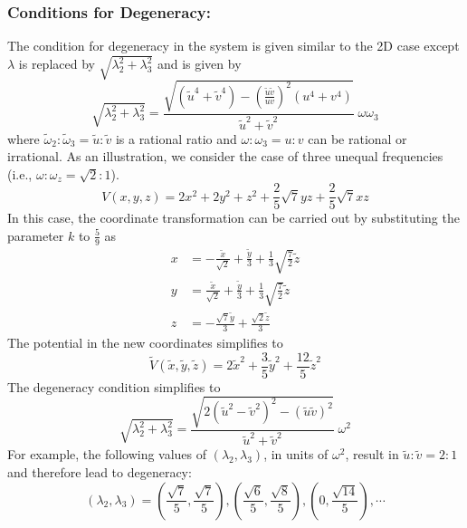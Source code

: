 \documentclass[a4paper, 12pt]{article}
\newcommand{\td}[1]{\tilde{#1}}
\begin{document}
\subsubsection*{Conditions for Degeneracy:}
The condition for degeneracy in the system is given similar to the 2D case except $\lambda$ is replaced by $\sqrt{\lambda_2^2+\lambda_3^2}$ and is given by
\begin{equation}
  \sqrt{\lambda_2^2 + \lambda_3^2} =\frac{\sqrt{(\td{u}^4+\td{v}^4)-\left(\frac{\td{u}\td{v}}{uv}\right)^2(u^4+v^4)}}{\td{u}^2+\td{v}^2}\;\omega\omega_3
\end{equation}
where $\td{\omega}_2:\td{\omega}_3=\td{u}:\td{v}$ is a rational ratio and $\omega:\omega_3=u:v$ can be rational or irrational.
As an illustration, we consider the case of three unequal frequencies (i.e., $\omega:\omega_z=\sqrt2:1$).
\[V(x,y,z)=2 x^2+2 y^2+z^2+\frac{2}{5} \sqrt{7} y z+\frac{2}{5} \sqrt{7} x z\]
In this case, the coordinate transformation can be carried out by substituting the parameter $k$ to $\frac{5}{9}$ as
\begin{align*}
  x&=-\frac{\tilde{x}}{\sqrt{2}}+\frac{\tilde{y}}{3} +\frac{1}{3}\sqrt{\frac{7}{2}}\tilde{z} \\
  y&=\frac{\tilde{x}}{\sqrt{2}}+\frac{\tilde{y}}{3} +\frac{1}{3}\sqrt{\frac{7}{2}}\tilde{z} \\
  z&=-\frac{ \sqrt7\tilde{y}}{3}+\frac{\sqrt2 \tilde{z}}{3}
\end{align*}
The potential in the new coordinates simplifies to
\[\tilde{V}(\tilde{x},\tilde{y},\tilde{z})=2 \tilde{x}^2+\frac{3}{5}\tilde{y}^2+\frac{12}{5} \tilde{z}^2\]
The degeneracy condition simplifies to
\begin{equation}
  \sqrt{\lambda_2^2 + \lambda_3^2} = \frac{\sqrt{2(\td{u}^2-\td{v}^2)^2-(\td{u}\td{v})^2}}{\td{u}^2+\td{v}^2}\;\omega^2
\end{equation}
For example, the following values of \((\lambda_2, \lambda_3)\), in units of \(\omega^2\), result in \(\td{u} : \td{v} = 2 : 1\) and therefore lead to degeneracy:  
\[
(\lambda_2, \lambda_3) = \left(\frac{\sqrt{7}}{5}, \frac{\sqrt{7}}{5}\right), \left(\frac{\sqrt6}{5}, \frac{\sqrt{8}}{5}\right), \left(0, \frac{\sqrt{14}}{5}\right), \cdots
\]


\end{document}
